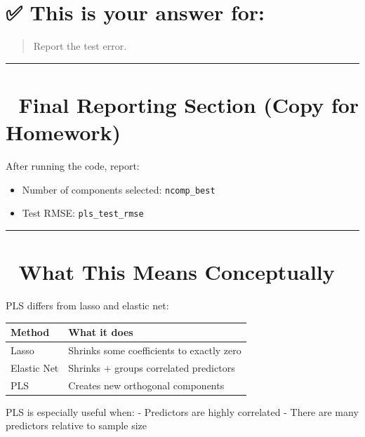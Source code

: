 \documentclass[
]{article}
\providecommand{\tightlist}{%
  \setlength{\itemsep}{0pt}\setlength{\parskip}{0pt}}
\begin{document}
\section{✅ This is your answer for:}\label{this-is-your-answer-for-1}

\begin{quote}
Report the test error.
\end{quote}

\begin{center}\rule{0.5\linewidth}{0.5pt}\end{center}

\section{🔷 Final Reporting Section (Copy for
Homework)}\label{final-reporting-section-copy-for-homework-1}

After running the code, report:

\begin{itemize}
\tightlist
\item
  Number of components selected: \texttt{ncomp\_best}
\item
  Test RMSE: \texttt{pls\_test\_rmse}
\end{itemize}

\begin{center}\rule{0.5\linewidth}{0.5pt}\end{center}

\section{🧠 What This Means
Conceptually}\label{what-this-means-conceptually}

PLS differs from lasso and elastic net:

\begin{longtable}[]{@{}ll@{}}
\toprule\noalign{}
Method & What it does \\
\midrule\noalign{}
\endhead
\bottomrule\noalign{}
\endlastfoot
Lasso & Shrinks some coefficients to exactly zero \\
Elastic Net & Shrinks + groups correlated predictors \\
PLS & Creates new orthogonal components \\
\end{longtable}

PLS is especially useful when: - Predictors are highly correlated -
There are many predictors relative to sample size
\end{document}
